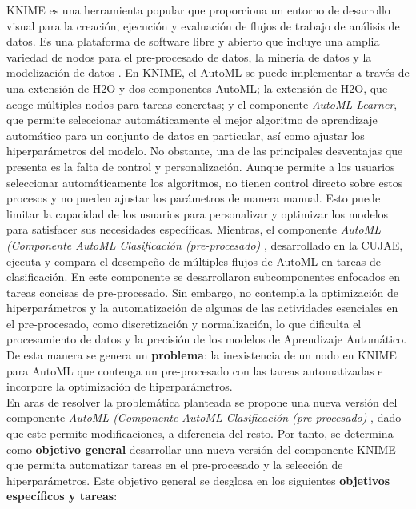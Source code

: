 KNIME es una herramienta popular que proporciona un entorno de desarrollo visual para la creación, ejecución y evaluación de flujos de trabajo de análisis de datos. Es una plataforma de software libre y abierto que incluye una amplia variedad de nodos para el pre-procesado de datos, la minería de datos y la modelización de datos \citep{knime2023}. En KNIME, el AutoML se puede implementar a través de una extensión de H2O y dos componentes AutoML; la extensión de H2O, que acoge múltiples nodos para tareas concretas; y el componente \textit{AutoML Learner}, que permite seleccionar automáticamente el mejor algoritmo de aprendizaje automático para un conjunto de datos en particular, así como ajustar los hiperparámetros del modelo. No obstante, una de las principales desventajas que presenta es la falta de control y personalización. Aunque permite a los usuarios seleccionar automáticamente los algoritmos, no tienen control directo sobre estos procesos y no pueden ajustar los parámetros de manera manual. Esto puede limitar la capacidad de los usuarios para personalizar y optimizar los modelos para satisfacer sus necesidades específicas. Mientras, el componente \textit{AutoML (Componente AutoML Clasificación (pre-procesado)} \citep{Carrazana2022}, desarrollado en la CUJAE, ejecuta y compara el desempeño de múltiples flujos de AutoML en tareas de clasificación. En este componente se desarrollaron subcomponentes enfocados en tareas concisas de pre-procesado. Sin embargo, no contempla la optimización de hiperparámetros y la automatización de algunas de las actividades esenciales en el pre-procesado, como discretización y normalización, lo que dificulta el procesamiento de datos y la precisión de los modelos de Aprendizaje Automático. De esta manera se genera un \textbf{problema}: la inexistencia de un nodo en KNIME para AutoML que contenga un pre-procesado con las tareas automatizadas e incorpore la optimización de hiperparámetros. \\
En aras de resolver la problemática planteada se propone una nueva versión del componente \textit{AutoML (Componente AutoML Clasificación (pre-procesado)} \citep{Carrazana2022}, dado que este permite modificaciones, a diferencia del resto. Por tanto, se determina como \textbf{objetivo general} desarrollar una nueva versión del componente KNIME que permita automatizar tareas en el pre-procesado y la selección de hiperparámetros. Este objetivo general se desglosa en los siguientes \textbf{objetivos específicos y tareas}:


